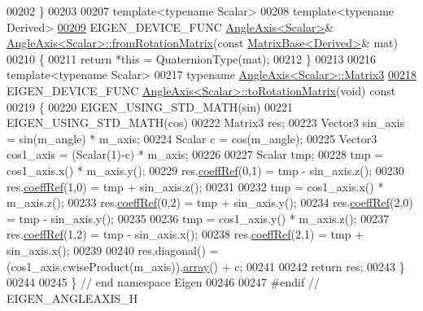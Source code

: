 \begin{DoxyCode}
00202 \}
00203 
00207 \textcolor{keyword}{template}<\textcolor{keyword}{typename} Scalar>
00208 \textcolor{keyword}{template}<\textcolor{keyword}{typename} Derived>
\hyperlink{group___geometry___module_a607f785f1f7d3c1b9ddc3d4f90419c0e}{00209} EIGEN\_DEVICE\_FUNC \hyperlink{group___geometry___module_class_eigen_1_1_angle_axis}{AngleAxis<Scalar>}& 
      \hyperlink{group___geometry___module_class_eigen_1_1_angle_axis}{AngleAxis<Scalar>::fromRotationMatrix}(\textcolor{keyword}{const} 
      \hyperlink{group___core___module_class_eigen_1_1_matrix_base}{MatrixBase<Derived>}& mat)
00210 \{
00211   \textcolor{keywordflow}{return} *\textcolor{keyword}{this} = QuaternionType(mat);
00212 \}
00213 
00216 \textcolor{keyword}{template}<\textcolor{keyword}{typename} Scalar>
00217 \textcolor{keyword}{typename} \hyperlink{group___core___module_class_eigen_1_1_matrix}{AngleAxis<Scalar>::Matrix3}
\hyperlink{group___geometry___module_a750ae6694e576bc6c49b635b56ef5306}{00218} EIGEN\_DEVICE\_FUNC \hyperlink{group___geometry___module_a750ae6694e576bc6c49b635b56ef5306}{AngleAxis<Scalar>::toRotationMatrix}(\textcolor{keywordtype}{void})\textcolor{keyword}{ const}
00219 \textcolor{keyword}{}\{
00220   EIGEN\_USING\_STD\_MATH(sin)
00221   EIGEN\_USING\_STD\_MATH(cos)
00222   Matrix3 res;
00223   Vector3 sin\_axis  = sin(m\_angle) * m\_axis;
00224   Scalar c = cos(m\_angle);
00225   Vector3 cos1\_axis = (Scalar(1)-c) * m\_axis;
00226 
00227   Scalar tmp;
00228   tmp = cos1\_axis.x() * m\_axis.y();
00229   res.\hyperlink{class_eigen_1_1_plain_object_base_a25626a55b26a4323565f79d1b7c48ea8}{coeffRef}(0,1) = tmp - sin\_axis.z();
00230   res.\hyperlink{class_eigen_1_1_plain_object_base_a25626a55b26a4323565f79d1b7c48ea8}{coeffRef}(1,0) = tmp + sin\_axis.z();
00231 
00232   tmp = cos1\_axis.x() * m\_axis.z();
00233   res.\hyperlink{class_eigen_1_1_plain_object_base_a25626a55b26a4323565f79d1b7c48ea8}{coeffRef}(0,2) = tmp + sin\_axis.y();
00234   res.\hyperlink{class_eigen_1_1_plain_object_base_a25626a55b26a4323565f79d1b7c48ea8}{coeffRef}(2,0) = tmp - sin\_axis.y();
00235 
00236   tmp = cos1\_axis.y() * m\_axis.z();
00237   res.\hyperlink{class_eigen_1_1_plain_object_base_a25626a55b26a4323565f79d1b7c48ea8}{coeffRef}(1,2) = tmp - sin\_axis.x();
00238   res.\hyperlink{class_eigen_1_1_plain_object_base_a25626a55b26a4323565f79d1b7c48ea8}{coeffRef}(2,1) = tmp + sin\_axis.x();
00239 
00240   res.diagonal() = (cos1\_axis.cwiseProduct(m\_axis)).\hyperlink{class_eigen_1_1array}{array}() + c;
00241 
00242   \textcolor{keywordflow}{return} res;
00243 \}
00244 
00245 \} \textcolor{comment}{// end namespace Eigen}
00246 
00247 \textcolor{preprocessor}{#endif // EIGEN\_ANGLEAXIS\_H}
\end{DoxyCode}
